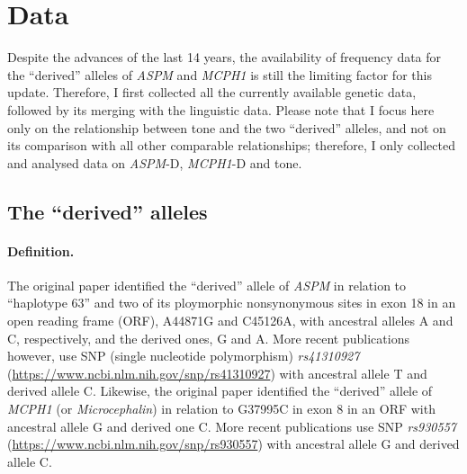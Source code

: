 \documentclass[twoside,twocolumn]{article}
\begin{document}

\section{Data}

Despite the advances of the last 14 years, the availability of frequency data for the ``derived'' alleles of \textit{ASPM} and \textit{MCPH1} is still the limiting factor for this update.
Therefore, I first collected all the currently available genetic data, followed by its merging with the linguistic data.
Please note that I focus here only on the relationship between tone and the two ``derived'' alleles, and not on its comparison with all other comparable relationships; therefore, I only collected and analysed data on \textit{ASPM}-D, \textit{MCPH1}-D and tone.

\subsection{The ``derived'' alleles}

\paragraph{Definition.}
The original \citet[p. 1720]{mekelbobrov_aspm_2005} paper identified the ``derived'' allele of \textit{ASPM} in relation to ``haplotype 63'' and two of its ploymorphic nonsynonymous sites in exon 18 in an open reading frame (ORF), A44871G and C45126A, with ancestral alleles A and C, respectively, and the derived ones, G and A.
More recent publications however, use SNP (single nucleotide polymorphism) \textit{rs41310927} (\url{https://www.ncbi.nlm.nih.gov/snp/rs41310927}) with ancestral allele T and derived allele C.
Likewise, the original \citet[p. 1717]{evans_microcephalin_2005} paper identified the ``derived'' allele of \textit{MCPH1} (or \textit{Microcephalin}) in relation to G37995C in exon 8 in an ORF with ancestral allele G and derived one C.
More recent publications use SNP \textit{rs930557} (\url{https://www.ncbi.nlm.nih.gov/snp/rs930557}) with ancestral allele G and derived allele C.
\end{document}
